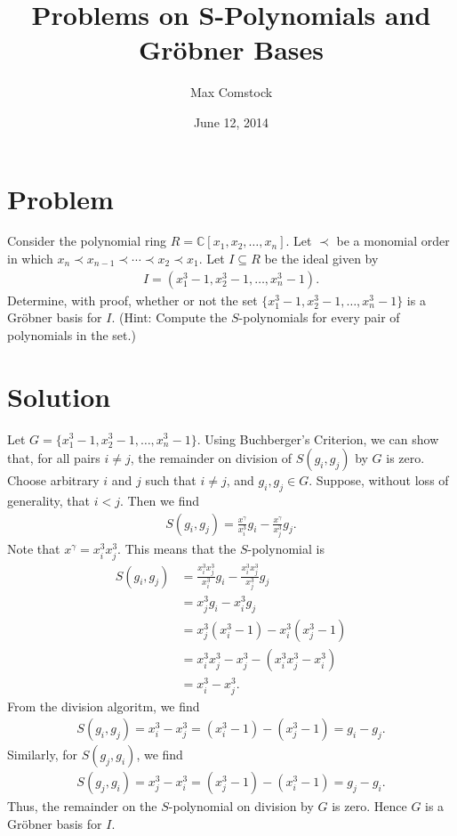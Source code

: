 \documentclass[letterpaper]{article}
\newcommand{\aln}[1]{\begin{align*} #1 \end{align*}} %
\begin{document}
\title{Problems on S-Polynomials and Gr\"obner Bases}
\author{Max Comstock}
\date{June 12, 2014}
\maketitle

\section*{Problem}
Consider the polynomial ring $R = \mathbb{C}[x_1,x_2,\ldots,x_n]$. Let $\prec$ be a monomial order in which $x_n \prec x_{n-1} \prec \cdots \prec x_2 \prec x_1$. Let $I \subseteq R$ be the ideal given by
\aln{
  I = (x_1^3 - 1, x_2^3 - 1, \ldots, x_n^3 - 1).
}
Determine, with proof, whether or not the set $\{x_1^3 - 1, x_2^3 - 1, \ldots, x_n^3 - 1\}$ is a Gr\"obner basis for $I$. (Hint: Compute the $S$-polynomials for every pair of polynomials in the set.)

\section*{Solution}
Let $G = \{x_1^3 - 1, x_2^3 - 1, \ldots, x_n^3 - 1\}$. Using Buchberger's Criterion, we can show that, for all pairs $i \neq j$, the remainder on division of $S(g_i, g_j)$ by $G$ is zero. Choose arbitrary $i$ and $j$ such that $i \neq j$, and $g_i, g_j \in G$. Suppose, without loss of generality, that $i < j$. Then we find
\aln{
  S(g_i, g_j) = \frac{x^\gamma}{x_i^3} g_i - \frac{x^\gamma}{x_j^3} g_j.
}
Note that $x^\gamma = x_i^3 x_j^3$. This means that the $S$-polynomial is
\aln{
  S(g_i, g_j) &= \frac{x_i^3 x_j^3}{x_i^3} g_i - \frac{x_i^3 x_j^3}{x_j^3} g_j\\
  &= x_j^3 g_i - x_i^3 g_j\\
  &= x_j^3 (x_i^3 - 1) - x_i^3 (x_j^3 - 1)\\
  &= x_i^3 x_j^3 - x_j^3 - (x_i^3 x_j^3 - x_i^3)\\
  &= x_i^3 - x_j^3.
}
From the division algoritm, we find
\aln{
  S(g_i, g_j) = x_i^3 - x_j^3 = (x_i^3 - 1) - (x_j^3 - 1) = g_i - g_j.
}
Similarly, for $S(g_j, g_i)$, we find
\aln{
  S(g_j, g_i) = x_j^3 - x_i^3 = (x_j^3 - 1) - (x_i^3 - 1) = g_j - g_i.
}
Thus, the remainder on the $S$-polynomial on division by $G$ is zero. Hence $G$ is a Gr\"obner basis for $I$.
\end{document}
